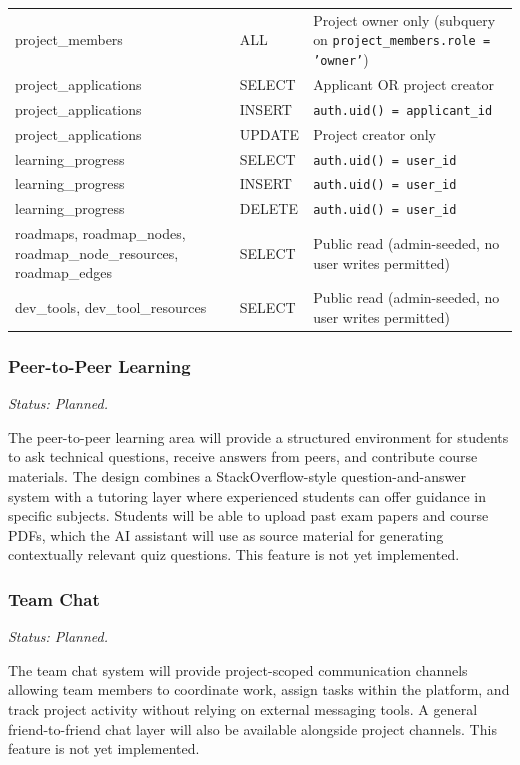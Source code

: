 \documentclass[12pt,a4paper]{article}
\begin{document}
\begin{longtable}{@{} L{3.2cm} L{2.2cm} L{8.8cm} @{}}
project\_members    & ALL     & Project owner only (subquery on \texttt{project\_members.role = 'owner'}) \\[4pt]
project\_applications & SELECT & Applicant OR project creator \\
project\_applications & INSERT & \texttt{auth.uid() = applicant\_id} \\
project\_applications & UPDATE & Project creator only \\[4pt]
learning\_progress  & SELECT  & \texttt{auth.uid() = user\_id} \\
learning\_progress  & INSERT  & \texttt{auth.uid() = user\_id} \\
learning\_progress  & DELETE  & \texttt{auth.uid() = user\_id} \\[4pt]
roadmaps, roadmap\_nodes, roadmap\_node\_resources, roadmap\_edges & SELECT & Public read (admin-seeded, no user writes permitted) \\[4pt]
dev\_tools, dev\_tool\_resources & SELECT & Public read (admin-seeded, no user writes permitted) \\
\end{longtable}

\subsubsection{Peer-to-Peer Learning}

\textit{Status: Planned.}

The peer-to-peer learning area will provide a structured environment for students to ask
technical questions, receive answers from peers, and contribute course materials. The
design combines a StackOverflow-style question-and-answer system with a tutoring layer
where experienced students can offer guidance in specific subjects. Students will be able
to upload past exam papers and course PDFs, which the AI assistant will use as source
material for generating contextually relevant quiz questions. This feature is not yet
implemented.

\subsubsection{Team Chat}

\textit{Status: Planned.}

The team chat system will provide project-scoped communication channels allowing team
members to coordinate work, assign tasks within the platform, and track project activity
without relying on external messaging tools. A general friend-to-friend chat layer will
also be available alongside project channels. This feature is not yet implemented.
\end{document}
